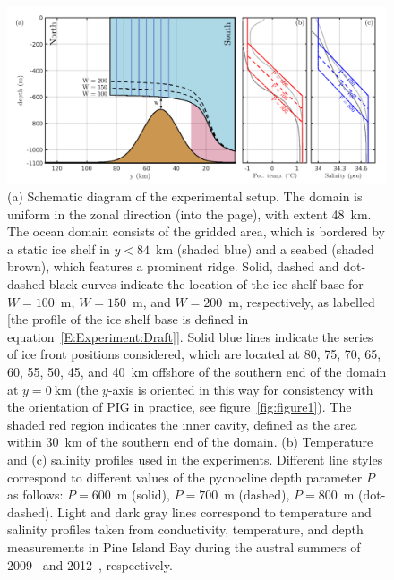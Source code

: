 \documentclass[draft]{agujournal2019}
\begin{document}
\begin{figure}
    \centering
    \includegraphics[width = \textwidth]{../make_figures/plots/figure2.pdf}
    \caption{(a) Schematic diagram of the experimental setup. The domain is uniform in the zonal direction (into the page), with extent 48~km. The ocean domain consists of the gridded area, which is bordered by a static ice shelf in $y < 84$~km (shaded blue) and a seabed (shaded brown), which features a prominent ridge. Solid, dashed and dot-dashed black curves indicate the location of the ice shelf base for $W=100$~m, $W=150$~m, and $W=200$~m, respectively, as labelled [the profile of the ice shelf base is defined in equation~\eqref{E:Experiment:Draft}]. Solid blue lines indicate the series of ice front positions considered, which are located at 80, 75, 70, 65, 60, 55, 50, 45, and 40~km offshore of the southern end of the domain at $y = 0~\text{km}$ (the $y$-axis is oriented in this way for consistency with the orientation of PIG in practice, see figure~\ref{fig:figure1}). The shaded red region indicates the inner cavity, defined as the area within 30~km of the southern end of the domain. (b) Temperature and (c) salinity profiles used in the experiments. Different line styles correspond to different values of the pycnocline depth parameter $P$ as follows: $P=600$~m (solid), $P=700$~m (dashed), $P=800$~m (dot-dashed). Light and dark gray lines correspond to temperature and salinity profiles taken from conductivity, temperature, and depth measurements in Pine Island Bay during the austral summers of 2009~\cite{Jacobs2011NatureGeosci} and 2012~\cite{Dutrieux2014Science}, respectively.}
    \label{fig:figure2}
\end{figure}
\end{document}
